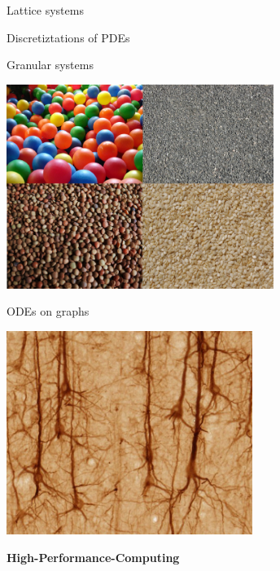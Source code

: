 \begin{frame}
 

\vspace{2ex}

\begin{minipage}{0.48\textwidth} \begin{center}
  Lattice systems

\end{center} \end{minipage}
\pause
\begin{minipage}{0.48\textwidth} \begin{center}
  Discretiztations of PDEs
\end{center} \end{minipage}

\pause
\vspace{2ex}

\begin{minipage}{0.48\textwidth}\begin{center}
  Granular systems

  \includegraphics[draft=false,width=0.65\textwidth]{granular_system.png}
 \end{center} \end{minipage}
\pause
\begin{minipage}{0.48\textwidth}\begin{center}
  ODEs on graphs

  \includegraphics[draft=false,width=0.6\textwidth]{neuron.jpg}
 \end{center}\end{minipage}

 \vspace{2ex}
 \centerline{\bf High-Performance-Computing}

\end{frame}



